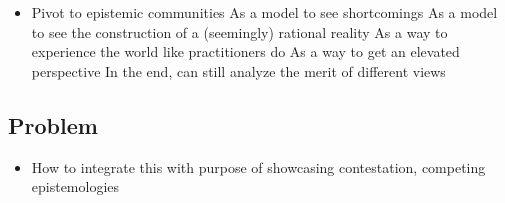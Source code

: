 \begin{itemize}
	\item Pivot to epistemic communities 
		\subitem As a model to see shortcomings
		\subitem As a model to see the construction of a (seemingly) rational reality
		\subitem As a way to experience the world like practitioners do
		\subitem As a way to get an elevated perspective
		\subitem In the end, can still analyze the merit of different views
\end{itemize}

\subsection*{Problem}

\begin{itemize}
	\item How to integrate this with purpose of showcasing contestation, competing epistemologies
\end{itemize}